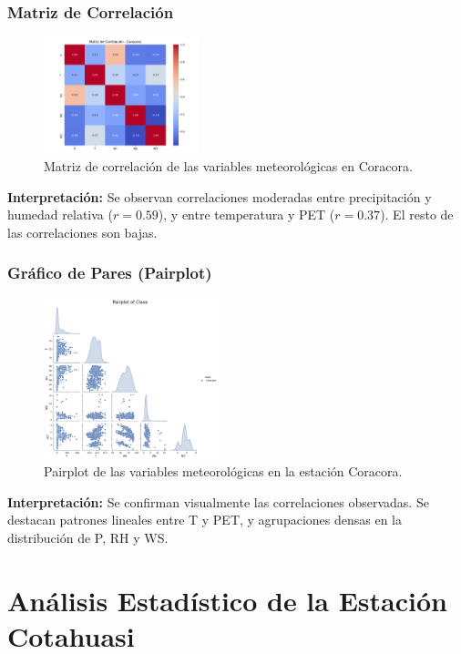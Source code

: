 \subsubsection*{Matriz de Correlación}
\begin{figure}[H]
\centering
\includegraphics[width=0.4\textwidth]{resultados/por_estacion_meteorologica/Coracora/matriz_correlacion.png}
\caption{Matriz de correlación de las variables meteorológicas en Coracora.}
\label{fig:coracora_corr}
\end{figure}
\textbf{Interpretación:} Se observan correlaciones moderadas entre precipitación y humedad relativa ($r = 0.59$), y entre temperatura y PET ($r = 0.37$). El resto de las correlaciones son bajas.

\subsubsection*{Gráfico de Pares (Pairplot)}
\begin{figure}[H]
\centering
\includegraphics[width=0.45\textwidth]{resultados/por_estacion_meteorologica/Coracora/pairplot.png}
\caption{Pairplot de las variables meteorológicas en la estación Coracora.}
\label{fig:coracora_pairplot}
\end{figure}
\textbf{Interpretación:} Se confirman visualmente las correlaciones observadas. Se destacan patrones lineales entre T y PET, y agrupaciones densas en la distribución de P, RH y WS.





\section{Análisis Estadístico de la Estación Cotahuasi}

